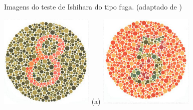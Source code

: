 \documentclass[	12pt, Times, openright, twoside, a4paper, english, brazil]{abntex2}
\begin{document}
\begin{apendicesenv}
\begin{figure}[!htb]
\caption{Imagens do teste de Ishihara do tipo fuga. (adaptado de )}
\label{fig:apendiceFuga}

\end{figure}



\begin{figure}[!htb]
\centering
{\includegraphics[width=\linewidth]{ishihara-transformacao/figureIshihara2.png}}
(a)
\endminipage\hfill
{}
\centering
{\includegraphics[width=\linewidth]{ishihara-transformacao/figureIshihara6.png}}

\end{figure}
\end{apendicesenv}
\end{document}
